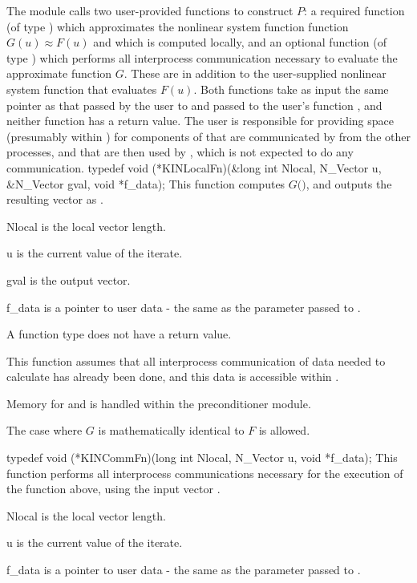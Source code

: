 The {\kinbbdpre} module calls two user-provided functions to construct $P$: 
a required function  (of type ) which
approximates the nonlinear system function function $G(u) \approx F(u)$ and which 
is computed locally, and an optional function  (of type ) 
which performs all interprocess communication necessary to evaluate 
the approximate function $G$.  
These are in addition to the user-supplied nonlinear system function that 
evaluates $F(u)$.
Both functions take as input the same pointer  as that passed
by the user to  and passed to the user's function ,
and neither function has a return value. The user is responsible for
providing space (presumably within ) for components of 
that are communicated by  from the other processes, and that are
then used by , which is not expected to do any communication.
{
  typedef void (*KINLocalFn)(&long int Nlocal, N\_Vector u, \\
                             &N\_Vector gval, void *f\_data);
}
{
  This function computes $G($$)$, and outputs the resulting
  vector as .
}
{
  \begin{args}[Nlocal]
  \item[Nlocal] 
    is the local vector length.
  \item[u]
    is the current value of the iterate.
  \item[gval]
    is the output vector.
  \item[f\_data]
    is a pointer to user data - the same as the       
    parameter passed to .  
  \end{args}
}
{
  A  function type does not have a return value.
}
{
  This function assumes that all interprocess communication of data needed to 
  calculate  has already been done, and this data is accessible within
  .

   Memory for  and  is handled within the preconditioner module.

  The case where $G$ is mathematically identical to $F$ is allowed.
}
{
  typedef void (*KINCommFn)(long int Nlocal, N\_Vector u, void *f\_data);
}
{
  This function performs all interprocess communications necessary 
  for the execution of the  function above, using the input vector .
}
{
  \begin{args}[Nlocal]
  \item[Nlocal] 
    is the local vector length.
  \item[u]
    is the current value of the iterate.
  \item[f\_data]
    is a pointer to user data - the same as the       
    parameter passed to .  
  \end{args}
}
